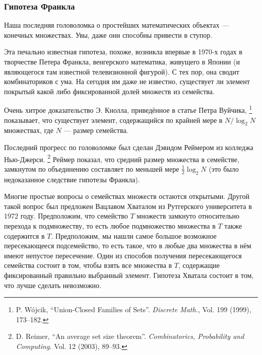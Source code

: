 \subsubsection*{Гипотеза Франкла}

Наша последняя головоломка о простейших математических объектах --- конечных множествах.
Увы, даже они способны привести в ступор.

Эта печально известная гипотеза, похоже, возникла впервые в 1970-х годах в творчестве Петера Франкла, венгерского математика, живущего в Японии (и являющегося там известной телевизионной фигурой).
С тех пор, она сводит комбинаториков с ума. 
На сегодня им даже не известно, существует ли элемент покрытый какой либо фиксированной долей множеств из семейства.

Очень хитрое доказательство Э. Кнолла, приведённое в статье Петра Вуйчика,%
\footnote{P. W\'{o}jcik, ``Union-Closed Families of Sets''. \emph{Discrete Math.}, Vol. 199 (1999), 173--182.}
показывает, что существует элемент, содержащийся по крайней мере в $N/\log_2 N$ множествах, где $N$ --- размер семейства.

Последний прогресс по головоломке был сделан Дэвидом Реймером из колледжа Нью-Джерси.%
\footnote{D. Reimer, ``An average set size theorem''. \emph{Combinatorics, Probability and Computing.} Vol. 12 (2003), 89--93.}
Реймер показал, что средний размер множества в семействе, замкнутом по объединению составляет по меньшей мере $\tfrac12\log_2N$ (это было недоказанное следствие гипотезы Франкла).

Многие простые вопросы о семействах множеств остаются открытыми.
Другой такой вопрос был предложен Вацлавом Хваталом из Рутгерского университета в 1972 году.
Предположим, что семейство $T$ множеств замкнуто относительно перехода к подмножеству, то есть любое подмножество множества в $T$ также содержится в $T$.
Предположим, мы нашли самое большое возможное пересекающееся подсемейство, то есть такое, что в любые два множества в нём имеют непустое пересечение.
Один из способов получения пересекающегося семейства состоит в том, чтобы взять все множества в $T$, содержащие фиксированный правильно выбранный элемент.
Гипотеза Хватала состоит в том, что лучше сделать невозможно.
